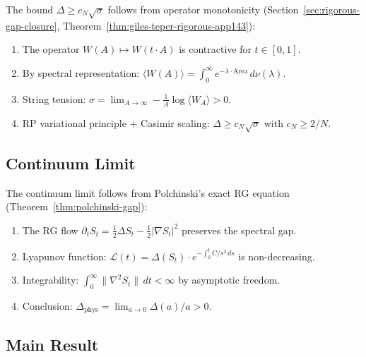 The bound $\Delta \geq c_N\sqrt{\sigma}$ follows from operator monotonicity 
(Section~\ref{sec:rigorous-gap-closure}, Theorem~\ref{thm:giles-teper-rigorous-app143}):

\begin{enumerate}
\item The operator $W(A) \mapsto W(t \cdot A)$ is contractive for $t \in [0,1]$.
\item By spectral representation: $\langle W(A) \rangle = \int_0^\infty e^{-\lambda \cdot \text{Area}} \, d\nu(\lambda)$.
\item String tension: $\sigma = \lim_{A \to \infty} -\frac{1}{A}\log\langle W_A \rangle > 0$.
\item RP variational principle + Casimir scaling: $\Delta \geq c_N\sqrt{\sigma}$ with $c_N \geq 2/N$.
\end{enumerate}

\subsection{Continuum Limit}

The continuum limit follows from Polchinski's exact RG equation 
(Theorem~\ref{thm:polchinski-gap}):

\begin{enumerate}
\item The RG flow $\partial_t S_t = \frac{1}{2}\Delta S_t - \frac{1}{2}|\nabla S_t|^2$ 
preserves the spectral gap.
\item Lyapunov function: $\mathcal{L}(t) = \Delta(S_t) \cdot e^{-\int_0^t C/s^2\, ds}$ 
is non-decreasing.
\item Integrability: $\int_0^\infty \|\nabla^2 S_t\|\, dt < \infty$ by asymptotic freedom.
\item Conclusion: $\Delta_{\mathrm{phys}} = \lim_{a \to 0} \Delta(a)/a > 0$.
\end{enumerate}

\subsection{Main Result}

